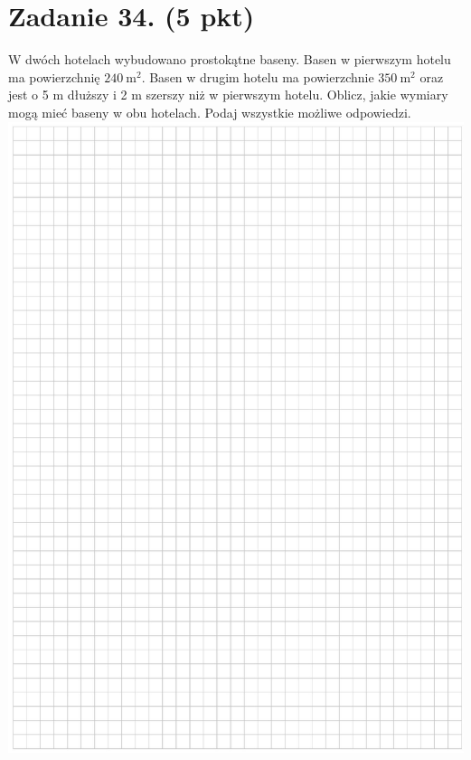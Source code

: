 \documentclass[10pt]{article}
\begin{document}
\section*{Zadanie 34. (5 pkt)}
W dwóch hotelach wybudowano prostokątne baseny. Basen w pierwszym hotelu ma powierzchnię \(240 \mathrm{~m}^{2}\). Basen w drugim hotelu ma powierzchnie \(350 \mathrm{~m}^{2}\) oraz jest o 5 m dłuższy i 2 m szerszy niż w pierwszym hotelu. Oblicz, jakie wymiary mogą mieć baseny w obu hotelach. Podaj wszystkie możliwe odpowiedzi.\\
\includegraphics[max width=\textwidth, center]{2024_11_21_caf6b2e64dd65c9b24eeg-18}\\
\end{document}
